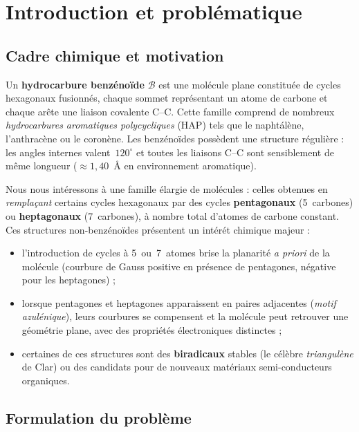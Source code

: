 \documentclass[12pt,a4paper]{article}
\theoremstyle{definition}
\theoremstyle{remark}
\newcommand{\B}{\mathcal{B}}
\begin{document}
\section{Introduction et probl\'ematique}

\subsection{Cadre chimique et motivation}

Un \textbf{hydrocarbure benz\'eno\"ide} $\B$ est une mol\'ecule plane
constitu\'ee de cycles hexagonaux fusionn\'es, chaque sommet
repr\'esentant un atome de carbone et chaque ar\^ete une liaison covalente
C--C. Cette famille comprend de nombreux \emph{hydrocarbures aromatiques
polycycliques} (HAP) tels que le napht\'al\`ene, l'anthrac\`ene ou le
coron\`ene. Les benz\'eno\"ides poss\`edent une structure r\'eguli\`ere :
les angles internes valent~$120^\circ$ et toutes les liaisons C--C sont
sensiblement de m\^eme longueur ($\approx 1{,}40$~\AA{} en environnement
aromatique).

Nous nous int\'eressons \`a une famille \'elargie de mol\'ecules :
celles obtenues en \emph{rempla\c{c}ant} certains cycles hexagonaux par des
cycles \textbf{pentagonaux} (5~carbones) ou \textbf{heptagonaux}
(7~carbones), \`a nombre total d'atomes de carbone constant. Ces structures
\og non-benz\'eno\"ides \fg{} pr\'esentent un int\'er\'et chimique majeur :
\begin{itemize}
  \item l'introduction de cycles \`a 5~ou~7~atomes brise la planarit\'e
        \emph{a priori} de la mol\'ecule (\og courbure de Gauss \fg{}
        positive en pr\'esence de pentagones, n\'egative pour les
        heptagones) ;
  \item lorsque pentagones et heptagones apparaissent en paires
        adjacentes (\emph{motif azul\'enique}), leurs courbures se
        compensent et la mol\'ecule peut retrouver une g\'eom\'etrie plane,
        avec des propri\'et\'es \'electroniques distinctes ;
  \item certaines de ces structures sont des \textbf{biradicaux} stables
        (le c\'el\`ebre \emph{triangul\`ene} de Clar) ou des candidats
        pour de nouveaux mat\'eriaux semi-conducteurs organiques.
\end{itemize}

\subsection{Formulation du probl\`eme}
\end{document}
